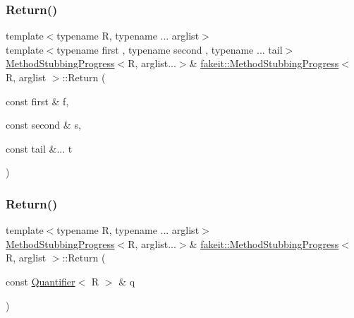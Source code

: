 \mbox{\label{structfakeit_1_1MethodStubbingProgress_ae8417ec5f29f70be1ae914755b05e4db}} 
\subsubsection{\texorpdfstring{Return()}{Return()}\hspace{0.1cm}{\footnotesize\ttfamily [26/45]}}
{\footnotesize\ttfamily template$<$typename R, typename ... arglist$>$ \\
template$<$typename first , typename second , typename ... tail$>$ \\
\mbox{\hyperlink{structfakeit_1_1MethodStubbingProgress}{Method\+Stubbing\+Progress}}$<$R, arglist...$>$\& \mbox{\hyperlink{structfakeit_1_1MethodStubbingProgress}{fakeit\+::\+Method\+Stubbing\+Progress}}$<$ R, arglist $>$\+::Return (\begin{DoxyParamCaption}\item[{const first \&}]{f,  }\item[{const second \&}]{s,  }\item[{const tail \&...}]{t }\end{DoxyParamCaption})\hspace{0.3cm}{\ttfamily [inline]}}

\mbox{\label{structfakeit_1_1MethodStubbingProgress_acb4d4db8208a8eaadff77e7cbf3775db}} 
\subsubsection{\texorpdfstring{Return()}{Return()}\hspace{0.1cm}{\footnotesize\ttfamily [27/45]}}
{\footnotesize\ttfamily template$<$typename R, typename ... arglist$>$ \\
\mbox{\hyperlink{structfakeit_1_1MethodStubbingProgress}{Method\+Stubbing\+Progress}}$<$R, arglist...$>$\& \mbox{\hyperlink{structfakeit_1_1MethodStubbingProgress}{fakeit\+::\+Method\+Stubbing\+Progress}}$<$ R, arglist $>$\+::Return (\begin{DoxyParamCaption}\item[{const \mbox{\hyperlink{structfakeit_1_1Quantifier}{Quantifier}}$<$ R $>$ \&}]{q }\end{DoxyParamCaption})\hspace{0.3cm}{\ttfamily [inline]}}

